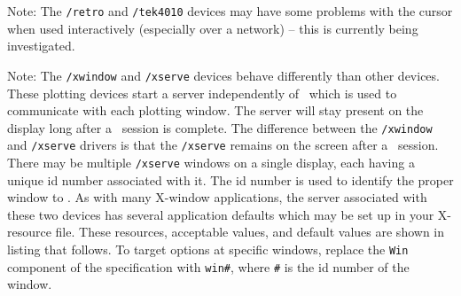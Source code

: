 {\sc Note:}
The {\tt /retro} and {\tt /tek4010} devices may have some
problems with the cursor when used interactively
(especially over a network) -- this is currently being investigated.

{\sc Note:}
The {\tt /xwindow} and {\tt /xserve} devices behave differently than
other devices.
These plotting devices start a server independently of \wip\ which is
used to communicate with each plotting window.  The server will stay
present on the display long after a \wip\ session is complete.
The difference between the {\tt /xwindow} and {\tt /xserve} drivers is
that the {\tt /xserve} remains on the screen after a \wip\ session.
There may be multiple {\tt /xserve} windows on a single display,
each having a unique id number associated with it.
The id number is used to identify the proper window to \wip.
As with many X-window applications, the server associated with these two
devices has several application defaults which may be set up in
your X-resource file.
These resources, acceptable values, and default values are shown in
listing that follows.
To target options at specific windows, replace the {\tt Win}
component of the specification with {\tt win\#}, where {\tt \#}
is the id number of the window.
